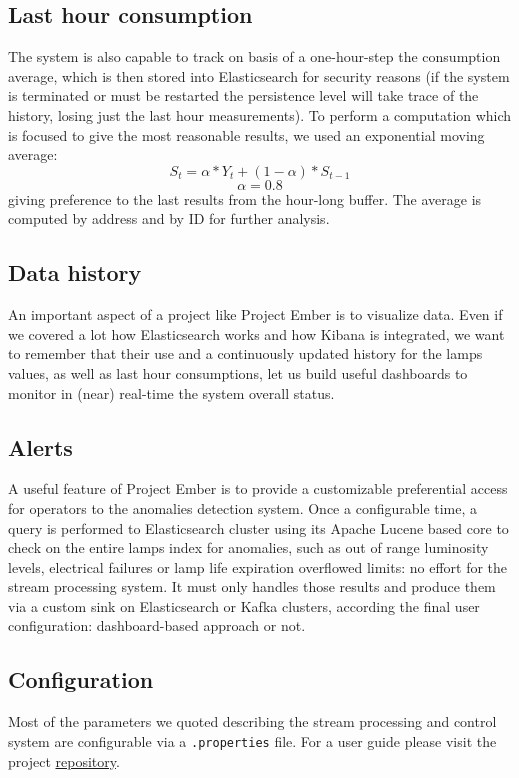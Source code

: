 \subsection*{Last hour consumption}
The system is also capable to track on basis of a one-hour-step the consumption average, which is then stored into Elasticsearch for security reasons (if the system is terminated or must be restarted the persistence level will take trace of the history, losing just the last hour measurements). To perform a computation which is focused to give the most reasonable results, we used an exponential moving average:
$$S_t = \alpha*Y_t + (1 - \alpha)*S_{t-1}$$
$$\alpha = 0.8$$
giving preference to the last results from the hour-long buffer. The average is computed by address and by ID for further analysis.
\subsection*{Data history}
An important aspect of a project like Project Ember is to visualize data. Even if we covered a lot how Elasticsearch works and how Kibana is integrated, we want to remember that their use and a continuously updated history for the lamps values, as well as last hour consumptions, let us build useful dashboards to monitor in (near) real-time the system overall status.

\subsection{Alerts}
A useful feature of Project Ember is to provide a customizable preferential access for operators to the anomalies detection system. Once a configurable time, a query is performed to Elasticsearch cluster using its Apache Lucene based core to check on the entire lamps index for anomalies, such as out of range luminosity levels, electrical failures or lamp life expiration overflowed limits: no effort for the stream processing system. It must only handles those results and produce them via a custom sink on Elasticsearch or Kafka clusters, according the final user configuration: dashboard-based approach or not.

\subsection{Configuration}
Most of the parameters we quoted describing the stream processing and control system are configurable via a \texttt{.properties} file. For a user guide please visit the project \href{https://github.com/projectember/project-ember}{repository}.

